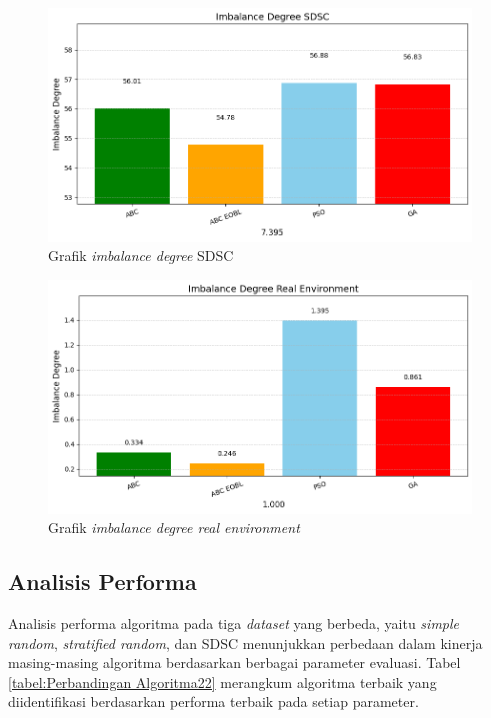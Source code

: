 \begin{figure} [H]
    \centering
    \includegraphics[width=0.75\linewidth]{gambar/Grafik Imbalance Degree SDSC.png}
    \caption{Grafik \textit{imbalance degree} SDSC}
\end{figure}

\newpage

\begin{figure} [H]
    \centering
    \includegraphics[width=0.75\linewidth]{gambar/Grafik Imbalance Degree Real Environment.png}
    \caption{Grafik \textit{imbalance degree real environment}}
\end{figure}

\subsection{Analisis Performa}
Analisis performa algoritma pada tiga \textit{dataset} yang berbeda, yaitu \textit{simple random}, \textit{stratified random}, dan SDSC menunjukkan perbedaan dalam kinerja masing-masing algoritma berdasarkan berbagai parameter evaluasi. Tabel \ref{tabel:Perbandingan Algoritma22} merangkum algoritma terbaik yang diidentifikasi berdasarkan performa terbaik pada setiap parameter.

